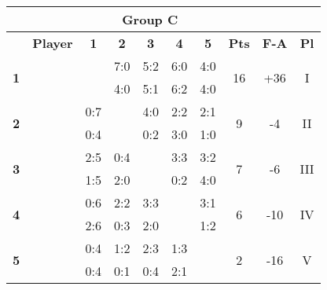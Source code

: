 \documentclass[10pt]{article}
\newcommand{\red}{\color{red}}
\newcommand{\blue}{\color{blue}}
\newcommand{\blank}{\cellcolor[gray]{.5}}
\begin{document}
\hspace{-5cm}
\begin{tabular}{|c|p{2.8cm}|c|c|c|c|c|c|c|c|}
	\multicolumn{9}{c}{\bf Group C} \\ \hline
	& \bf Player & \bf1 & \bf2 & \bf3 & \bf4 & \bf5 & \bf Pts & \bf F-A & \bf Pl \\ \hline
	\multirow{2}{*}{\bf1}&\multirow{2}{*}{}      & \blank & \red7:0 & \red5:2 & \red6:0 & \red4:0 &\multirow{2}{*}{16}&\multirow{2}{*}{+36}&\multirow{2}{*}{I} \\ && \blank & \red4:0 & \red5:1 & \red6:2 & \red4:0 &&& \\ \hline
	\multirow{2}{*}{\bf2}&\multirow{2}{*}{}     & \blue0:7 & \blank & \red4:0 & 2:2 & \red2:1 &\multirow{2}{*}{9}&\multirow{2}{*}{-4}&\multirow{2}{*}{II} \\      && \blue0:4 & \blank & \blue0:2 & \red3:0 & \red1:0 &&& \\ \hline
	\multirow{2}{*}{\bf3}&\multirow{2}{*}{}     & \blue2:5 & \blue0:4 & \blank & 3:3 & \red3:2 &\multirow{2}{*}{7}&\multirow{2}{*}{-6}&\multirow{2}{*}{III} \\     && \blue1:5 & \red2:0 & \blank & \blue0:2 & \red4:0 &&& \\ \hline
	\multirow{2}{*}{\bf4}&\multirow{2}{*}{}     & \blue0:6 & 2:2 & 3:3 & \blank & \red3:1 &\multirow{2}{*}{6}&\multirow{2}{*}{-10}&\multirow{2}{*}{IV} \\     && \blue2:6 & \blue0:3 & \red2:0 & \blank & \blue1:2 &&& \\ \hline
	\multirow{2}{*}{\bf5}&\multirow{2}{*}{}     & \blue0:4 & \blue1:2 & \blue2:3 & \blue1:3 & \blank &\multirow{2}{*}{2}&\multirow{2}{*}{-16}&\multirow{2}{*}{V} \\     && \blue0:4 & \blue0:1 & \blue0:4 & \red2:1 & \blank &&& \\ \hline
\end{tabular}
\hspace{0.2cm}
\end{document}
